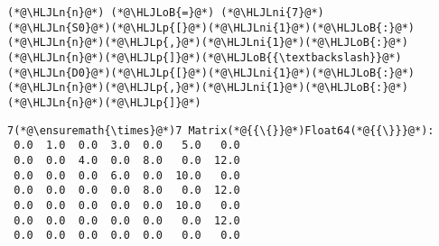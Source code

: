 \documentclass[12pt,a4paper]{article}
\newcommand{\HLJLn}[1]{#1}
\newcommand{\HLJLni}[1]{\textcolor[RGB]{59,151,46}{#1}}
\newcommand{\HLJLoB}[1]{\textcolor[RGB]{102,102,102}{\textbf{#1}}}
\newcommand{\HLJLp}[1]{#1}
\begin{document}
\begin{lstlisting}
(*@\HLJLn{n}@*) (*@\HLJLoB{=}@*) (*@\HLJLni{7}@*)
(*@\HLJLn{S0}@*)(*@\HLJLp{[}@*)(*@\HLJLni{1}@*)(*@\HLJLoB{:}@*)(*@\HLJLn{n}@*)(*@\HLJLp{,}@*)(*@\HLJLni{1}@*)(*@\HLJLoB{:}@*)(*@\HLJLn{n}@*)(*@\HLJLp{]}@*)(*@\HLJLoB{{\textbackslash}}@*)(*@\HLJLn{D0}@*)(*@\HLJLp{[}@*)(*@\HLJLni{1}@*)(*@\HLJLoB{:}@*)(*@\HLJLn{n}@*)(*@\HLJLp{,}@*)(*@\HLJLni{1}@*)(*@\HLJLoB{:}@*)(*@\HLJLn{n}@*)(*@\HLJLp{]}@*)
\end{lstlisting}

\begin{lstlisting}
7(*@\ensuremath{\times}@*)7 Matrix(*@{{\{}}@*)Float64(*@{{\}}}@*):
 0.0  1.0  0.0  3.0  0.0   5.0   0.0
 0.0  0.0  4.0  0.0  8.0   0.0  12.0
 0.0  0.0  0.0  6.0  0.0  10.0   0.0
 0.0  0.0  0.0  0.0  8.0   0.0  12.0
 0.0  0.0  0.0  0.0  0.0  10.0   0.0
 0.0  0.0  0.0  0.0  0.0   0.0  12.0
 0.0  0.0  0.0  0.0  0.0   0.0   0.0
\end{lstlisting}


\begin{lstlisting}

\end{lstlisting}
\end{document}
